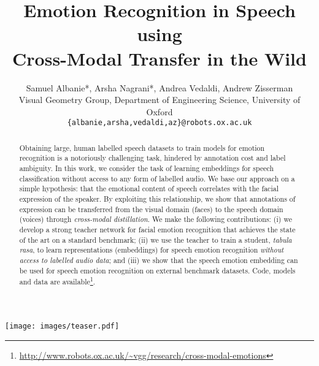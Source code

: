 \documentclass[sigconf]{acmart}
\begin{document}
\title{Emotion Recognition in Speech using \\ 
       Cross-Modal Transfer in the Wild} 
       




%
 \author{Samuel Albanie*,  Arsha Nagrani*,  Andrea Vedaldi,  Andrew Zisserman \hspace{2em} \\
Visual Geometry Group, Department of Engineering Science, University of Oxford\\
{\tt\small \{albanie,arsha,vedaldi,az\}@robots.ox.ac.uk}} \begin{teaserfigure}
    \centering
    \texttt{[image: images/teaser.pdf]}
    \caption{{\textbf Cross-modal transfer}:  A  CNN for speech emotion recognition (the student, ) 
is trained by distilling the knowledge of a pretrained facial emotion recognition network (the teacher, ) across unlabelled video. The student aims to exploit redundancy between the audio and visual signals  and  to learn embeddings, reducing dependence on labelled speech.}
    \vspace{1em}
\end{teaserfigure}
 \begin{abstract}
Obtaining large, human labelled speech datasets to train models for emotion recognition is a notoriously challenging task, hindered by annotation cost and label ambiguity. In this work, we consider the task of learning embeddings for speech classification without access to any form of labelled audio.  
We base our approach on a simple hypothesis: that the emotional content of speech correlates with the facial expression of the speaker.  By exploiting this relationship, we show that annotations of expression can be transferred from the visual domain (faces) to the speech domain (voices) through \textit{cross-modal distillation}.  We make the following contributions: 
(i) we develop a strong teacher network for facial emotion recognition
that achieves the state of the art on a standard benchmark;
(ii) we use the teacher to train a student, \textit{tabula rasa}, to learn representations (embeddings) for speech emotion recognition \textit{without access to labelled audio data}; and
(iii) we show that the speech emotion embedding can be used for speech emotion recognition on external benchmark datasets.
Code, models and data are available\footnote{\url{http://www.robots.ox.ac.uk/~vgg/research/cross-modal-emotions}}. 
\end{abstract}
\end{document}
